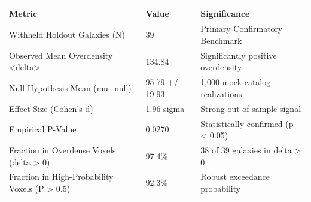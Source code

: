 \begin{tabular}{lll}
\hline
Metric & Value & Significance \\
\hline
Withheld Holdout Galaxies (N) & 39 & Primary Confirmatory Benchmark \\
Observed Mean Overdensity <delta> & 134.84 & Significantly positive overdensity \\
Null Hypothesis Mean (mu\_null) & 95.79 +/- 19.93 & 1,000 mock catalog realizations \\
Effect Size (Cohen's d) & 1.96 sigma & Strong out-of-sample signal \\
Empirical P-Value & 0.0270 & Statistically confirmed (p < 0.05) \\
Fraction in Overdense Voxels (delta > 0) & 97.4\% & 38 of 39 galaxies in delta > 0 \\
Fraction in High-Probability Voxels (P > 0.5) & 92.3\% & Robust exceedance probability \\
\hline
\end{tabular}
